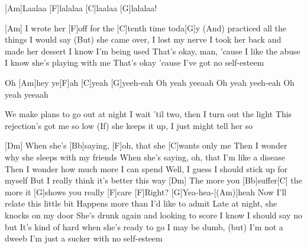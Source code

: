 

\begin{guitar}
	[Am]Laalaa [F]lalalaa [C]laalaa [G]lalalaa!
	
	[Am] I wrote her [F]off for the [C]tenth time toda[G]y
	(And) practiced all the things I would say
	(But) she came over, I lost my nerve
	I took her back and made her dessert
	I know I'm being used
	That's okay, man, 'cause I like the abuse
	I know she's playing with me
	That's okay 'cause I've got no self-esteem
	
	Oh [Am]hey ye[F]ah [C]yeah [G]yeeh-eah
	Oh yeah yeeaah
	Oh yeah yeeh-eah
	Oh yeah yeeaah
	
	We make plans to go out at night
	I wait 'til two, then I turn out the light
	This rejection's got me so low
	(If) she keeps it up, I just might tell her so
	
	 
	
	[Dm] When she's [Bb]saying, [F]oh, that she [C]wants only me
	Then I wonder why she sleeps with my friends
	When she's saying, oh, that I'm like a disease
	Then I wonder how much more I can spend
	Well, I guess I should stick up for myself
	But I really think it's better this way
	[Dm] The more you [Bb]suffer[C] the more it [G]shows you really [F]care
	[F]Right? [G]Yea-hea-[(Am)]heah
	\pagebreak
	Now I'll relate this little bit
	Happens more than I'd like to admit
	Late at night, she knocks on my door
	She's drunk again and looking to score
	I know I should say no but
	It's kind of hard when she's ready to go
	I may be dumb, (but) I'm not a dweeb
	I'm just a sucker with no self-esteem
	
	 
	
	 
\end{guitar}